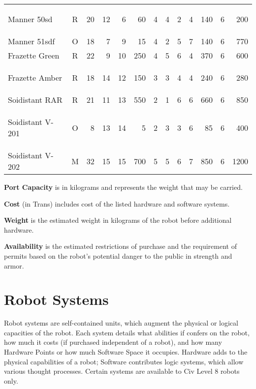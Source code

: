 \begin{table}[htbp]
{\begin{minipage}{6in}
\begin{tabular}{lcrrrrrrrrrrr}
        \hypertarget{tag:bot-manner-50sd}{Manner 50sd}      & R & 20 & 12 &  6 &  60 & 4 & 4 & 2 & 4 & 140 & 6 & 200\\
        Manner 51sdf     & O & 18 &  7 &  9 &  15 & 4 & 2 & 5 & 7 & 140 & 6 & 770\\
        \rowcolor{grey}
        Frazette Green   & R & 22 &  9 & 10 & 250 & 4 & 5 & 6 & 4 & 370 & 6 & 600\\
        \hypertarget{tag:bot-frazette-amber}{Frazette Amber}   & R & 18 & 14 & 12 & 150 & 3 & 3 & 4 & 4 & 240 & 6 & 280\\
        \rowcolor{grey}
        Soidistant RAR   & R & 21 & 11 & 13 & 550 & 2 & 1 & 6 & 6 & 660 & 6 & 850\\
        \hypertarget{tag:bot-soidistant-v-201}{Soidistant V-201} & O &  8 & 13 & 14 &   5 & 2 & 3 & 3 & 6 &  85 & 6 & 400\\
        \rowcolor{grey}
        Soidistant V-202 & M & 32 & 15 & 15 & 700 & 5 & 5 & 6 & 7 & 850 & 6 &1200\\
      \end{tabular}

      \medskip
      
      \parbox{\textwidth}{\textbf{Port Capacity} is in kilograms and
        represents the weight that may be carried.
        
        \textbf{Cost} (in Trans) includes cost of the listed hardware
        and software systems.
        
        \textbf{Weight} is the estimated weight in kilograms of the
        robot before additional hardware.
        
        \textbf{Availability} is the estimated restrictions of
        purchase and the requirement of permits based on the robot's
        potential danger to the public in strength and armor.}
    \end{minipage}}
\end{table}

\section{Robot Systems}

Robot systems are self-contained units, which augment the physical or
logical capacities of the robot. Each system details what abilities if
confers on the robot, how much it costs (if purchased independent of a
robot), and how many Hardware Points or how much Software Space it
occupies. Hardware adds to the physical capabilities of a robot;
Software contributes logic systems, which allow various thought
processes. Certain systems are available to Civ Level 8 robots only.

